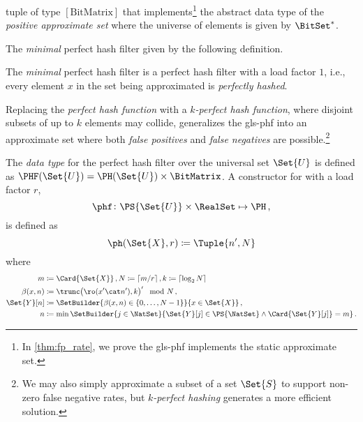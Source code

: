 \documentclass[ ../main.tex]{subfiles}
\begin{document}
tuple of type $[\textrm{BitMatrix}]$ that implements\footnote{In \cref{thm:fp_rate}, we prove the \gls{gls-phf} implements the static approximate set.} the abstract data type of the \emph{positive approximate set} where the universe of elements is given by $\BitSet^*$.


The \emph{minimal} perfect hash filter given by the following definition.
\begin{definition}
The \emph{minimal} perfect hash filter is a perfect hash filter with a load factor $1$, i.e., every element $x$ in the set being approximated is \emph{perfectly hashed}.
\end{definition}
Replacing the \emph{perfect hash function} with a \emph{$k$-perfect hash function}, where disjoint subsets of up to $k$ elements may collide, generalizes the \gls{gls-phf} into an approximate set where both \emph{false positives} and \emph{false negatives} are possible.\footnote{We may also simply approximate a subset of a set $\Set{S}$ to support non-zero false negative rates, but \emph{$k$-perfect hashing} generates a more efficient solution.}






The \emph{data type} for the perfect hash filter over the universal set $\Set{U}$ is defined as $\PHF(\Set{U}) = \PH(\Set{U}) \times \BitMatrix$.
A constructor for \PHF with a load factor $r$,
\begin{equation}
\phf \colon \PS{\Set{U}} \times \RealSet \mapsto \PH\,,
\end{equation}
is defined as
\begin{equation}
\ph(\Set{X}, r) \coloneqq \Tuple{n',N}
\end{equation}
where
\begin{equation}
\begin{split}
m			& \coloneqq \Card{\Set{X}}\,, N \coloneqq \lceil m / r \rceil\,,k \coloneqq \lceil\log_2 N\rceil\\
\beta(x,n) 	& \coloneqq \trunc\!\left(\ro(x' \cat n'),k\right)' \mod N\,,\\
\Set{Y}[n] 	& \coloneqq \SetBuilder{\beta(x,n) \in \{0,\ldots,N-1\}}{x \in 
	\Set{X}}\,,\\
n 			& \coloneqq \min{\SetBuilder{ j \in \NatSet }{ \Set{Y}[j] \in \PS{\NatSet} \land \Card{\Set{Y}[j]} = m}}\,.
\end{split}
\end{equation}
\end{document}
